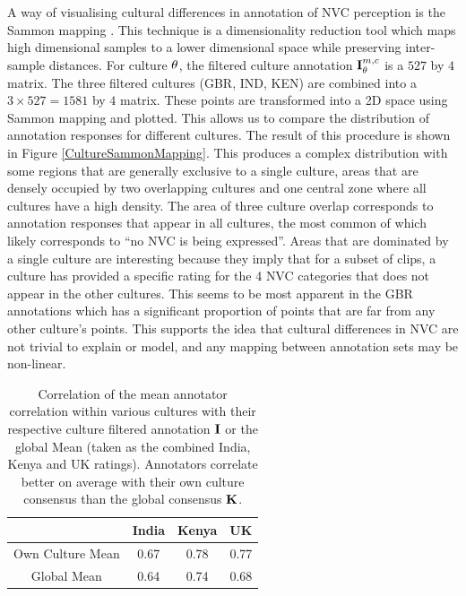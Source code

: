 A way of visualising cultural differences in annotation of \ac{NVC} perception is the Sammon mapping \cite{Sammon1969}. This technique is a dimensionality reduction tool which maps high dimensional samples to a lower dimensional space while preserving inter-sample distances. For culture $\theta$, the filtered culture annotation $\textbf{I}^{m, c}_{\theta}$ is a $527$ by $4$ matrix. The three filtered cultures  (GBR, IND, KEN) are combined into a $3 \times 527 = 1581$ by $4$ matrix. These points are transformed into a 2{D} space using Sammon mapping and plotted. This allows us to compare the distribution of annotation responses for different cultures. The result of this procedure is shown in Figure \ref{CultureSammonMapping}. This produces a complex distribution with some regions that are generally exclusive to a single culture, areas that are densely occupied by two overlapping cultures and one central zone where all cultures have a high density. The area of three culture overlap corresponds to annotation responses that appear in all cultures, the most common of which likely corresponds to ``no \ac{NVC} is being expressed''. Areas that are dominated by a single culture are interesting because they imply that for a subset of clips, a culture has provided a specific rating for the 4 \ac{NVC} categories that does not appear in the other cultures. This seems to be most apparent in the GBR annotations which has a significant proportion of points that are far from any other culture's points. This supports the idea that cultural differences in \ac{NVC} are not trivial to explain or model, and any mapping between \culturallySpecific annotation sets may be non-linear. 



\begin{table}
\centering
\caption[Correlation of the mean annotator correlation within various cultures with their respective culture filtered annotation $\filteredAnnotation$ or the global Mean (taken as the combined India, Kenya and \ac{UK} ratings).]{Correlation of the mean annotator correlation within various cultures with their respective culture filtered annotation $\filteredAnnotation$ or the global Mean (taken as the combined India, Kenya and \ac{UK} ratings). Annotators correlate better on average with their own culture consensus than the global consensus $\textbf{K}$.}
\begin{tabular}{ | c | c c c | }
\hline
 & India & Kenya & \ac{UK} \\
\hline
\hline
Own Culture Mean & 0.67 & 0.78 & 0.77 \\
Global Mean & 0.64 & 0.74 & 0.68 \\
\hline
\end{tabular}
\label{MeanAnnotatorCorrelationTable}
\end{table}

